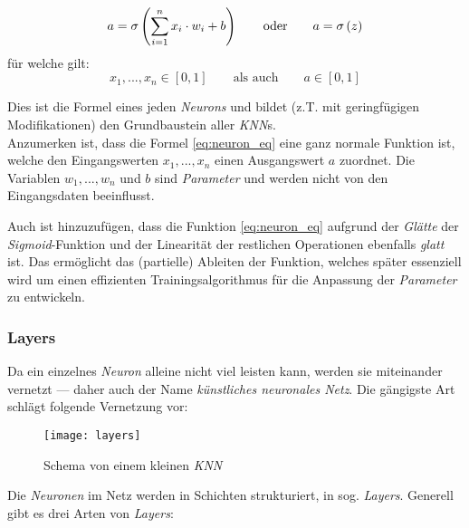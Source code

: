 \begin{equation}\label{eq:neuron_eq}
a = \sigma \left( \sum_{i=1}^{n} x_i\cdot w_i+b\right)  \qquad \text{oder} \qquad a = \sigma \left( z \right)
\vspace*{2mm}
\end{equation}
für welche gilt:
\[x_1,...,x_n \in \left[0, 1\right] \qquad \text{als auch} \qquad a\in \left[0, 1\right] \]

Dies ist die Formel eines jeden \textit{Neurons} und bildet (z.T. mit geringfügigen Modifikationen) den Grundbaustein aller \textit{KNN}s.\\

Anzumerken ist, dass die Formel \ref{eq:neuron_eq} eine ganz normale Funktion ist, welche den Eingangswerten $x_1,...,x_n$ einen Ausgangswert $a$ zuordnet. Die Variablen $w_1,...,w_n$ und $b$ sind \textit{Parameter} und werden nicht von den Eingangsdaten beeinflusst.

Auch ist hinzuzufügen, dass die Funktion \ref{eq:neuron_eq} aufgrund der \textit{Glätte} der \textit{Sigmoid}-Funktion und der Linearität der restlichen Operationen ebenfalls \textit{glatt} ist. Das ermöglicht das (partielle) Ableiten der Funktion, welches später essenziell wird um einen effizienten Trainingsalgorithmus für die Anpassung der \textit{Parameter} zu entwickeln.

\newpage

\subsubsection{Layers}\label{cha:theo:layers}

Da ein einzelnes \textit{Neuron} alleine nicht viel leisten kann, werden sie miteinander vernetzt --- daher auch der Name \textit{künstliches neuronales Netz}. Die gängigste Art schlägt folgende Vernetzung vor:

\begin{figure}[h]
	\centering
	\texttt{[image: layers]}
	\caption[Schema von kleinem \textit{KNN}]{Schema von einem kleinen \textit{KNN}}
	\label{img:layers}
\end{figure}

Die \textit{Neuronen} im Netz werden in Schichten strukturiert, in sog. \textit{Layers}\footnotemark. Generell gibt es drei Arten von \textit{Layers}:


